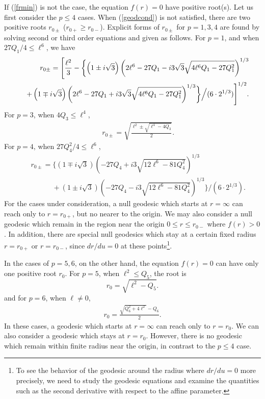 \documentclass[a4paper,12pt]{article}
\begin{document}
If (\ref{frmin}) is not the case, 
the equation $f(r)=0$ have positive root(s). 
Let us first consider the $p\le 4$ cases. 
When (\ref{geodcond}) is not satisfied, there
are two positive roots $r_{0\pm}$ 
($r_{0+}\ge r_{0-}$). 
Explicit forms of $r_{0\pm}$ for $p=1,3,4$ are
found by solving second or third order equations
and given as follows. 
For $p=1$, and when $27Q_1/4\le \ell^6$, we have
\begin{eqnarray*}
&&\hspace{-0.5cm} r_{0\pm}=\Biggl[
\frac{\ell^2}{3}-\biggl\{
\left(1\pm i\sqrt{3}\right)
\left(2\ell^6-27Q_1- i3\sqrt{3}\sqrt{4\ell^6Q_1-27Q_1^2}\right)^{1/3}
\nonumber \\
&&\;\; 
+\left(1\mp i\sqrt{3}\right)\left(2\ell^6-27Q_1+ i3\sqrt{3}\sqrt{4\ell^6Q_1-27Q_1^2}\right)^{1/3}
\biggr\}
\Big/
(6\cdot 2^{1/3})
\Biggr]^{1/2}.
\end{eqnarray*}
For $p=3$, when $4Q_3\le \ell^4$, 
\begin{eqnarray*}
&&r_{0\pm}=\sqrt{\frac{\ell^2\pm\sqrt{\ell^4-4Q_3}}{2}}.
\end{eqnarray*}
For $p=4$, when $27Q_{4}^{2}/4\le \ell^{6}$,
\begin{eqnarray*}
&&r_{0\pm}=
\Biggl\{
\left(1\mp i\sqrt{3}\right)\left(-27Q_4+i3\sqrt{12\ell^{6}-81Q_4^2}\right)^{1/3}
\nonumber \\
&&\quad \quad\quad
+\left(1\pm i\sqrt{3}\right)\left(-27Q_4-i3\sqrt{12\ell^{6}-81Q_4^2}\right)^{1/3}
\Biggr\}\Bigg/(6\cdot 2^{1/3}).
\end{eqnarray*}
For the cases under consideration, a null geodesic  
which starts at $r=\infty$ can reach only to $r=r_{0+}$, 
but no nearer to the origin.
We may also consider a null geodesic which remain 
in the region near the origin $0\le r\le r_{0-}$
where $f(r)>0$.
In addition, there are special null geodesics which stay
at a certain fixed radius $r=r_{0+}$ or $r=r_{0-}$,
since $dr/du=0$  at these points\footnote{%
To see the behavior of the geodesic around
the radius where $dr/du=0$ more precisely, we need to
study the geodesic equations and examine the quantities 
such as the second derivative with respect to the affine 
parameter.}.

In the cases of $p=5,6$,
on the other hand, the equation $f(r)=0$ can have only
one positive root $r_{0}$. For $p=5$, when $\ell^2\le Q_5$,
the root is  
\begin{equation}
r_0=\sqrt{\ell^2-Q_5}.
\end{equation}
and for $p=6$, when $\ell\neq 0$,
\begin{eqnarray}
r_{0}=\frac{\sqrt{Q_6^2+4\ell^2}-Q_6}{2}.
\end{eqnarray}
In these cases,
a geodesic which starts at $r=\infty$ can reach
only to $r=r_0$. We can also consider a geodesic which
stays at $r=r_0$. However, there is no geodesic which
remain within finite radius near the origin, in contrast
to the $p\le 4$ case. 
\end{document}
